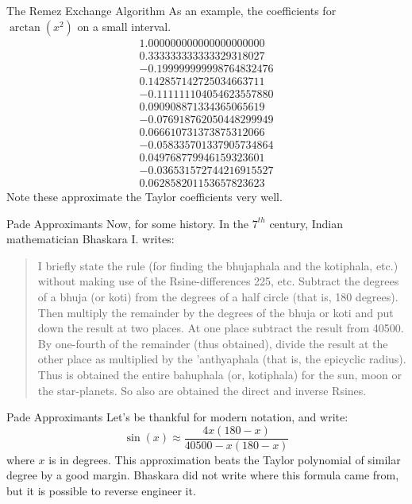 \documentclass{beamer}
\begin{document}
    \begin{frame}{The Remez Exchange Algorithm}
        As an example, the coefficients for $\arctan(x^2)$ on a small interval.
        \begin{align}
            1.000000000000000000000\\
            0.333333333333329318027\\
            -0.199999999998764832476\\
            0.142857142725034663711\\
            -0.111111104054623557880\\
            0.090908871334365065619\\
            -0.076918762050448299949\\
            0.066610731373875312066\\
            -0.058335701337905734864\\
            0.049768779946159323601\\
            -0.036531572744216915527\\
            0.062858201153657823623
        \end{align}
        Note these approximate the Taylor coefficients very well.
    \end{frame}
    \begin{frame}{Pade Approximants}
        Now, for some history. In the $7^{th}$ century, Indian mathematician
        Bhaskara I. writes:
        \begin{quote}
            I briefly state the rule (for finding the bhujaphala
            and the kotiphala, etc.) without making use of the
            Rsine-differences 225, etc. Subtract the degrees of a bhuja
            (or koti) from the degrees of a half circle (that is, 180 degrees).
            Then multiply the remainder by the degrees of the bhuja or koti
            and put down the result at two places. At one place subtract the
            result from 40500. By one-fourth of the remainder (thus obtained),
            divide the result at the other place as multiplied by the
            'anthyaphala (that is, the epicyclic radius). Thus is obtained
            the entire bahuphala (or, kotiphala) for the sun, moon or the
            star-planets. So also are obtained the direct and inverse Rsines.
        \end{quote}
    \end{frame}
    \begin{frame}{Pade Approximants}
        Let's be thankful for modern notation, and write:
        \begin{equation}
            \sin(x)\approx\frac{4x(180-x)}{40500-x(180-x)}
        \end{equation}
        where $x$ is in degrees. This approximation beats the Taylor polynomial
        of similar degree by a good margin. Bhaskara did not write where this
        formula came from, but it is possible to reverse engineer it.
    \end{frame}
\end{document}
